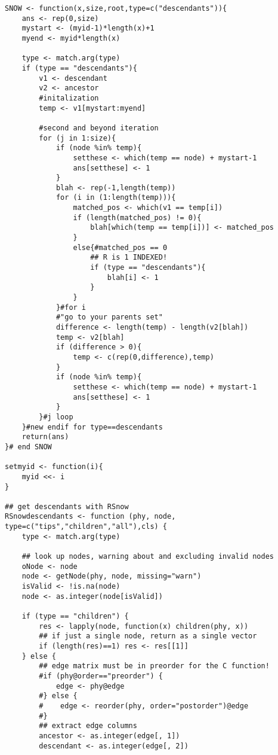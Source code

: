 \documentclass[11pt,letterpaper]{article}
\begin{document}
\begin{lstlisting}[style=MyR]
SNOW <- function(x,size,root,type=c("descendants")){
    ans <- rep(0,size)
    mystart <- (myid-1)*length(x)+1
    myend <- myid*length(x)

    type <- match.arg(type)
    if (type == "descendants"){
        v1 <- descendant
        v2 <- ancestor
        #initalization
        temp <- v1[mystart:myend]

        #second and beyond iteration
        for (j in 1:size){
            if (node %in% temp){
                setthese <- which(temp == node) + mystart-1
                ans[setthese] <- 1
            }
            blah <- rep(-1,length(temp))
            for (i in (1:length(temp))){
                matched_pos <- which(v1 == temp[i])
                if (length(matched_pos) != 0){
                    blah[which(temp == temp[i])] <- matched_pos
                }
                else{#matched_pos == 0
                    ## R is 1 INDEXED!
                    if (type == "descendants"){
                        blah[i] <- 1
                    }
                }
            }#for i 
            #"go to your parents set"
            difference <- length(temp) - length(v2[blah])
            temp <- v2[blah]
            if (difference > 0){
                temp <- c(rep(0,difference),temp)
            }
            if (node %in% temp){
                setthese <- which(temp == node) + mystart-1
                ans[setthese] <- 1
            }
        }#j loop
    }#new endif for type==descendants
    return(ans)
}# end SNOW

setmyid <- function(i){
    myid <<- i
}

## get descendants with RSnow
RSnowdescendants <- function (phy, node, type=c("tips","children","all"),cls) {
    type <- match.arg(type)

    ## look up nodes, warning about and excluding invalid nodes
    oNode <- node
    node <- getNode(phy, node, missing="warn")
    isValid <- !is.na(node)
    node <- as.integer(node[isValid])

    if (type == "children") {
        res <- lapply(node, function(x) children(phy, x))
        ## if just a single node, return as a single vector
        if (length(res)==1) res <- res[[1]]
    } else {
        ## edge matrix must be in preorder for the C function!
        #if (phy@order=="preorder") {
            edge <- phy@edge
        #} else {
        #    edge <- reorder(phy, order="postorder")@edge
        #}
        ## extract edge columns
        ancestor <- as.integer(edge[, 1])
        descendant <- as.integer(edge[, 2])


\end{lstlisting}
\end{document}
